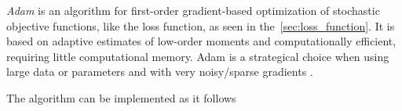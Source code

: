 \emph{Adam} is an algorithm for first-order gradient-based optimization of stochastic objective functions, like the loss function, as seen in the~\cref{sec:loss_function}.
It is based on adaptive estimates of low-order moments and computationally efficient, requiring little computational memory.
Adam is a strategical choice when using large data or parameters and with very noisy/sparse gradients \citep{kingma2017}.

The algorithm can be implemented as it follows




